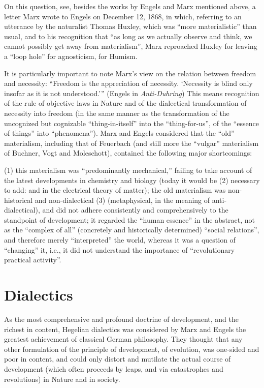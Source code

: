 \documentclass[a4paper,12pt]{book}
\begin{document}
On this question, see, besides the works by Engels and Marx mentioned above, a letter Marx wrote to Engels on December 12, 1868, in which, referring to an utterance by the naturalist Thomas Huxley, which was “more materialistic” than usual, and to his recognition that “as long as we actually observe and think, we cannot possibly get away from materialism”, Marx reproached Huxley for leaving a “loop hole” for agnosticism, for Humism.

It is particularly important to note Marx’s view on the relation between freedom and necessity: “Freedom is the appreciation of necessity. ‘Necessity is blind only insofar as it is not understood.’” (Engels in \emph{Anti-Duhring}) This means recognition of the rule of objective laws in Nature and of the dialectical transformation of necessity into freedom (in the same manner as the transformation of the uncognized but cognizable “thing-in-itself” into the “thing-for-us”, of the “essence of things” into “phenomena”). Marx and Engels considered that the “old” materialism, including that of Feuerbach (and still more the “vulgar” materialism of Buchner, Vogt and Moleschott), contained the following major shortcomings:

(1) this materialism was “predominantly mechanical,” failing to take account of the latest developments in chemistry and biology (today it would be (2) necessary to add: and in the electrical theory of matter); the old materialism was non-historical and non-dialectical (3) (metaphysical, in the meaning of anti-dialectical), and did not adhere consistently and comprehensively to the standpoint of development; it regarded the “human essence” in the abstract, not as the “complex of all” (concretely and historically determined) “social relations”, and therefore merely “interpreted” the world, whereas it was a question of “changing” it, i.e., it did not understand the importance of “revolutionary practical activity”.

\section*{Dialectics}
As the most comprehensive and profound doctrine of development, and the richest in content, Hegelian dialectics was considered by Marx and Engels the greatest achievement of classical German philosophy. They thought that any other formulation of the principle of development, of evolution, was one-sided and poor in content, and could only distort and mutilate the actual course of development (which often proceeds by leaps, and via catastrophes and revolutions) in Nature and in society.
\end{document}
